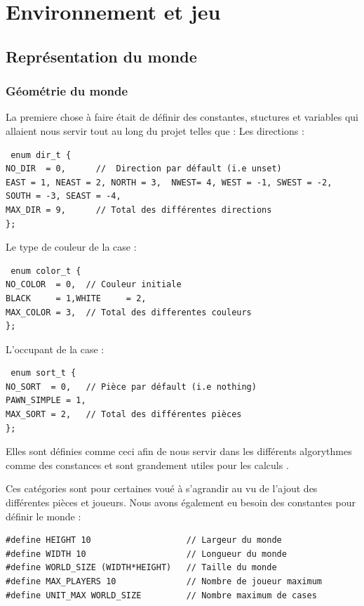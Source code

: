 \chapter{Environnement et jeu}

\section{Représentation du monde}
    \subsection{Géométrie du monde}
        La premiere chose à faire était de définir des constantes, stuctures et variables qui allaient nous servir tout au long du projet telles que :
        \medbreak
        \noindent Les directions :
        
        \begin{lstlisting}
 enum dir_t {
NO_DIR  = 0,      //  Direction par défault (i.e unset)
EAST = 1, NEAST = 2, NORTH = 3,  NWEST= 4, WEST = -1, SWEST = -2, SOUTH = -3, SEAST = -4,  
MAX_DIR = 9,      // Total des différentes directions
};
        \end{lstlisting}
        
        \noindent Le type de couleur de la case :
        
        \begin{lstlisting}
 enum color_t {
NO_COLOR  = 0,  // Couleur initiale 
BLACK     = 1,WHITE     = 2,
MAX_COLOR = 3,  // Total des differentes couleurs
};      \end{lstlisting}
        
        \noindent L'occupant de la case :
        
        \begin{lstlisting}
 enum sort_t {
NO_SORT  = 0,   // Pièce par défault (i.e nothing)
PAWN_SIMPLE = 1,
MAX_SORT = 2,   // Total des différentes pièces 
};  \end{lstlisting}

        Elles sont définies comme ceci afin de nous servir dans les différents algorythmes comme des constances et sont grandement utiles pour les calculs . 
        
        \noindent Ces catégories sont pour certaines voué à s'agrandir au vu de l'ajout des différentes pièces et joueurs.
        \medbreak
        \noindent Nous avons également eu besoin des constantes pour définir le monde :
        \medbreak
        \begin{lstlisting}
#define HEIGHT 10                   // Largeur du monde
#define WIDTH 10                    // Longueur du monde
#define WORLD_SIZE (WIDTH*HEIGHT)   // Taille du monde
#define MAX_PLAYERS 10              // Nombre de joueur maximum
#define UNIT_MAX WORLD_SIZE         // Nombre maximum de cases \end{lstlisting}

